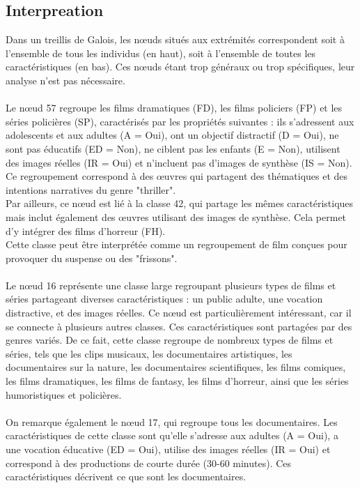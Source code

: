 \documentclass{article}
\begin{document}
\subsection{Interpreation}

Dans un treillis de Galois, les nœuds situés aux extrémités correspondent soit à l’ensemble de tous les individus (en haut), soit à l’ensemble de toutes les caractéristiques (en bas). Ces nœuds étant trop généraux ou trop spécifiques, leur analyse n’est pas nécessaire.
\\
\\
Le nœud 57 regroupe les films dramatiques (FD), les films policiers (FP) et les séries policières (SP), caractérisés par les propriétés suivantes : ils s’adressent aux adolescents et aux adultes (A = Oui), ont un objectif distractif (D = Oui), ne sont pas éducatifs (ED = Non), ne ciblent pas les enfants (E = Non), utilisent des images réelles (IR = Oui) et n’incluent pas d’images de synthèse (IS = Non). Ce regroupement correspond à des œuvres qui partagent des thématiques et des intentions narratives du genre "thriller".
\\
Par ailleurs, ce nœud est lié à la classe 42, qui partage les mêmes caractéristiques mais inclut également des œuvres utilisant des images de synthèse. Cela permet d’y intégrer des films d’horreur (FH).
\\
Cette classe peut être interprétée comme un regroupement de film conçues pour provoquer du suspense ou des "frissons".
\\
\\
Le nœud 16 représente une classe large regroupant plusieurs types de films et séries partageant diverses caractéristiques : un public adulte, une vocation distractive, et des images réelles. Ce nœud est particulièrement intéressant, car il se connecte à plusieurs autres classes. Ces caractéristiques sont partagées par des genres variés. De ce fait, cette classe regroupe de nombreux types de films et séries, tels que les clips musicaux, les documentaires artistiques, les documentaires sur la nature, les documentaires scientifiques, les films comiques, les films dramatiques, les films de fantasy, les films d’horreur, ainsi que les séries humoristiques et policières.
\\
\\
On remarque également le nœud 17, qui regroupe tous les documentaires. Les caractéristiques de cette classe sont qu’elle s’adresse aux adultes (A = Oui), a une vocation éducative (ED = Oui), utilise des images réelles (IR = Oui) et correspond à des productions de courte durée (30-60 minutes). Ces caractéristiques décrivent ce que sont les documentaires.
\\
\end{document}
